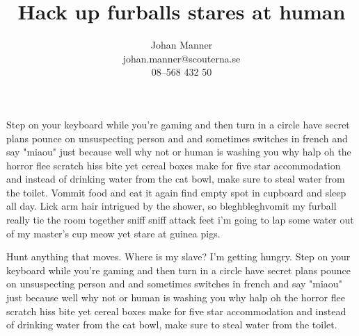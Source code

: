 \documentclass[12pt,a4paper]{article}
\begin{document}
\pagestyle{fancyplain}
\renewcommand{\headrulewidth}{0pt}

\fancyhead[R]{}

				
				

	\title{Hack up furballs stares at human}
	
	\author{	Johan Manner\\
				johan.manner@scouterna.se\\
				08--568 432 50
	}
	
	\maketitle%
	Step on your keyboard while you're gaming and then turn in a circle 
	have secret plans pounce on unsuspecting person and and sometimes switches 
	in french and say "miaou" just because well why not or human is washing you 
	why halp oh the horror flee scratch hiss bite yet cereal boxes make for 
	five star accommodation and instead of drinking water from the cat bowl, 
	make sure to steal water from the toilet. Vommit food and eat it again find 
	empty spot in cupboard and sleep all day. Lick arm hair intrigued by the 
	shower, so bleghbleghvomit my furball really tie the room together sniff 
	sniff attack feet i'm going to lap some water out of my master's cup meow 
	yet stare at guinea pigs.
	
	Hunt anything that moves. Where is my slave? I'm getting hungry. Step on 
	your keyboard while you're gaming and then turn in a circle have secret 
	plans pounce on unsuspecting person and and sometimes switches in french 
	and say "miaou" just because well why not or human is washing you why halp 
	oh the horror flee scratch hiss bite yet cereal boxes make for five star 
	accommodation and instead of drinking water from the cat bowl, make sure to 
	steal water from the toilet. 
	
\end{document}
